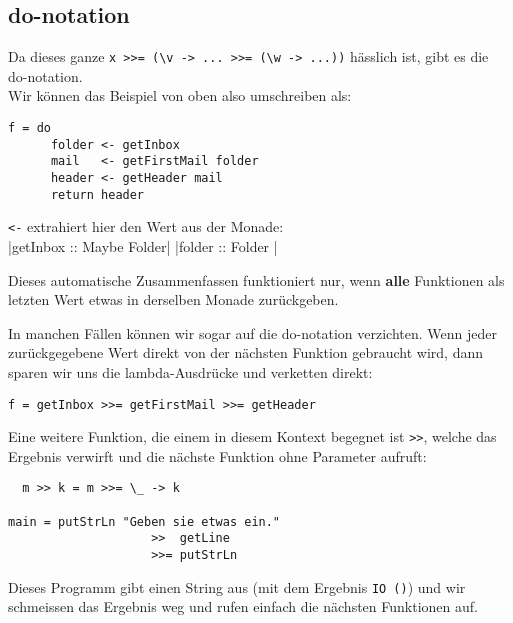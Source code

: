 \documentclass{beamer}
\begin{document}
\subsection{do-notation}
\begin{frame}[fragile]
Da dieses ganze \texttt{x >>= (\textbackslash v -> ... >>= (\textbackslash w -> ...))} hässlich ist, gibt es die do-notation.\\
Wir können das Beispiel von oben also umschreiben als:
\pause
\begin{verbatim}
f = do
      folder <- getInbox
      mail   <- getFirstMail folder
      header <- getHeader mail
      return header
\end{verbatim}
\pause
\texttt{<-} extrahiert hier den Wert \glqq aus der Monade\grqq :\\
|getInbox :: Maybe Folder|
|folder   :: Folder      |
\pause
\begin{important}Dieses automatische Zusammenfassen funktioniert nur, wenn \textbf{alle} Funktionen als letzten Wert etwas in derselben Monade zurückgeben.\end{important}
\end{frame}

\begin{frame}[fragile]
In manchen Fällen können wir sogar auf die do-notation verzichten. Wenn jeder zurückgegebene Wert direkt von der nächsten Funktion gebraucht wird, dann sparen wir uns die lambda-Ausdrücke und verketten direkt:
\pause
\begin{verbatim}
f = getInbox >>= getFirstMail >>= getHeader
\end{verbatim}
\pause
Eine weitere Funktion, die einem in diesem Kontext begegnet ist \texttt{>>}, welche das Ergebnis verwirft und die nächste Funktion ohne Parameter aufruft:
\begin{verbatim}
  m >> k = m >>= \_ -> k                    

main = putStrLn "Geben sie etwas ein."
                    >>  getLine 
                    >>= putStrLn
\end{verbatim}
\pause
Dieses Programm gibt einen String aus (mit dem Ergebnis \texttt{IO ()}) und wir schmeissen das Ergebnis weg und rufen einfach die nächsten Funktionen auf.
\end{frame}
\end{document}
